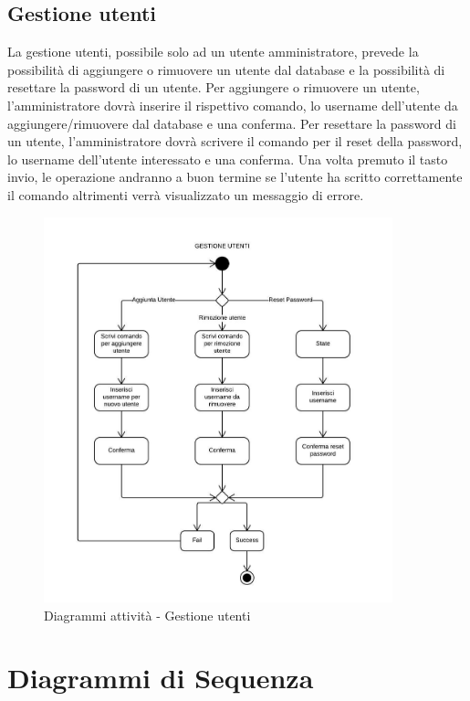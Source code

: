 \documentclass{scalatekids-article}
\begin{document}
\subsection{Gestione utenti}

La gestione utenti, possibile solo ad un utente amministratore, prevede la
possibilità di aggiungere o rimuovere un utente dal database e la possibilità
di resettare la password di un utente. Per aggiungere o rimuovere un utente,
l'amministratore dovrà inserire il rispettivo comando, lo username dell'utente
da aggiungere/rimuovere dal database e una conferma. Per resettare la password
di un utente, l'amministratore dovrà scrivere il comando per il reset della
password, lo username dell'utente interessato e una conferma. Una volta
premuto il tasto invio, le operazione andranno a buon termine se l'utente ha
scritto correttamente il comando altrimenti verrà visualizzato un messaggio di
errore.

\begin{figure}[H]
  \begin{center}
    \includegraphics[width=0.9\textwidth, keepaspectratio]{img/diagrammiAttivita/gestioneUtenti.jpeg}
    \caption{Diagrammi attività - Gestione utenti}
  \end{center}
\end{figure}

\section{Diagrammi di Sequenza}
\end{document}
